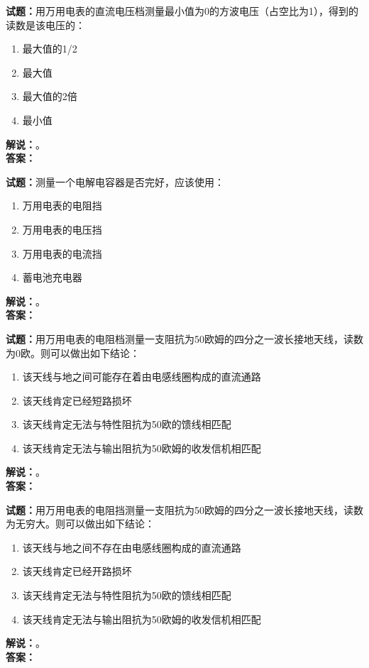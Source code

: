\documentclass{ctexbook}
\begin{document}
\noindent\textbf{试题：}用万用电表的直流电压档测量最小值为0的方波电压（占空比为1），得到的读数是该电压的：
\begin{enumerate}[leftmargin=3em]
  \item 最大值的1/2
  \item 最大值
  \item 最大值的2倍
  \item 最小值
\end{enumerate}
\noindent\textbf{解说：}\textbf{}。\\\noindent\textbf{答案：}

\bigskip

\noindent\textbf{试题：}测量一个电解电容器是否完好，应该使用：
\begin{enumerate}[leftmargin=3em]
  \item 万用电表的电阻挡
  \item 万用电表的电压挡
  \item 万用电表的电流挡
  \item 蓄电池充电器
\end{enumerate}
\noindent\textbf{解说：}\textbf{}。\\\noindent\textbf{答案：}

\bigskip

\noindent\textbf{试题：}用万用电表的电阻档测量一支阻抗为50欧姆的四分之一波长接地天线，读数为0欧。则可以做出如下结论：
\begin{enumerate}[leftmargin=3em]
  \item 该天线与地之间可能存在着由电感线圈构成的直流通路
  \item 该天线肯定已经短路损坏
  \item 该天线肯定无法与特性阻抗为50欧的馈线相匹配
  \item 该天线肯定无法与输出阻抗为50欧姆的收发信机相匹配
\end{enumerate}
\noindent\textbf{解说：}\textbf{}。\\\noindent\textbf{答案：}

\bigskip

\noindent\textbf{试题：}用万用电表的电阻挡测量一支阻抗为50欧姆的四分之一波长接地天线，读数为无穷大。则可以做出如下结论：
\begin{enumerate}[leftmargin=3em]
  \item 该天线与地之间不存在由电感线圈构成的直流通路
  \item 该天线肯定已经开路损坏
  \item 该天线肯定无法与特性阻抗为50欧的馈线相匹配
  \item 该天线肯定无法与输出阻抗为50欧姆的收发信机相匹配
\end{enumerate}
\noindent\textbf{解说：}\textbf{}。\\\noindent\textbf{答案：}
\end{document}
